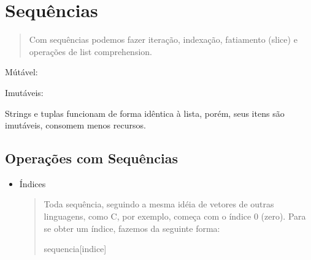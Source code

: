 \documentclass[letterpaper,10pt,brazil]{sphinxmanual}
\begin{document}
\begin{sphinxVerbatim}[commandchars=\\\{\}]
\end{sphinxVerbatim}

\begin{sphinxVerbatim}[commandchars=\\\{\}]
\end{sphinxVerbatim}

\begin{sphinxVerbatim}[commandchars=\\\{\}]
\end{sphinxVerbatim}


\chapter{Sequências}
\label{\detokenize{content/sequences:sequencias}}\label{\detokenize{content/sequences::doc}}\begin{quote}

Com sequências podemos fazer iteração, indexação, fatiamento (slice) e operações de list comprehension.
\end{quote}

Mútável:


Imutáveis:



Strings e tuplas funcionam de forma idêntica à lista, porém, seus itens são imutáveis, consomem menos recursos.


\section{Operações com Sequências}
\label{\detokenize{content/sequences:operacoes-com-sequencias}}\begin{itemize}
\item {} 
Índices
\begin{quote}

Toda sequência, seguindo a mesma idéia de vetores de outras linguagens, como C, por exemplo, começa com o índice 0 (zero).
Para se obter um índice, fazemos da seguinte forma:

sequencia{[}indice{]}
\end{quote}

\end{itemize}
\end{document}
